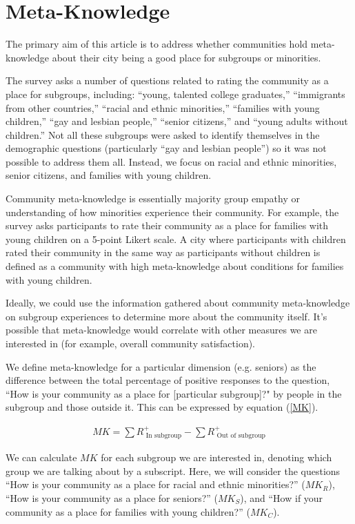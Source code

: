 \documentclass[smallextended]{svjour3}\usepackage[]{graphicx}\usepackage[]{color}
\begin{document}
\section{Meta-Knowledge}
\label{metasec}
The primary aim  of this article is to address whether communities hold meta-knowledge about their city being a good place for subgroups or minorities. 

The survey asks a number of questions related to rating the community as a place for subgroups, including: ``young, talented college graduates,'' ``immigrants from other countries,'' ``racial and ethnic minorities,'' ``families with young children,'' ``gay and lesbian people,'' ``senior citizens,'' and ``young adults without children.'' Not all these subgroups were asked to identify themselves in the demographic questions (particularly ``gay and lesbian people'') so it was not possible to address them all. Instead, we focus on racial and ethnic minorities, senior citizens, and families with young children.

Community meta-knowledge is essentially majority group empathy or understanding of how minorities experience their community. For example, the survey asks participants to rate their community as a place for families with young children on a 5-point Likert scale. A city where participants with children rated their community in the same way as participants without children is defined as a community with high meta-knowledge about conditions for families with young children. 

Ideally, we could use the information gathered about community meta-knowledge on subgroup experiences to determine more about the community itself. It's possible that meta-knowledge would correlate with other measures we are interested in (for example, overall community satisfaction). 

We define meta-knowledge for a particular dimension (e.g. seniors) as the difference between the total percentage of positive responses to the question, ``How is your community as a place for [particular subgroup]?" by people in the subgroup and those outside it. This can be expressed by equation (\ref{MK}). 

\begin{eqnarray}
\label{MK}
MK = \sum R^{+}_{\mbox{ In subgroup}} - \sum R^{+}_{\mbox{ Out of subgroup}}
\end{eqnarray}

We can calculate $MK$ for each subgroup we are interested in, denoting which group we are talking about by a subscript. Here, we will consider the questions ``How is your community as a place for racial and ethnic minorities?'' ($MK_R$), ``How is your community as a place for seniors?'' ($MK_S$), and ``How if your community as a place for families with young children?'' ($MK_C$).
\end{document}
